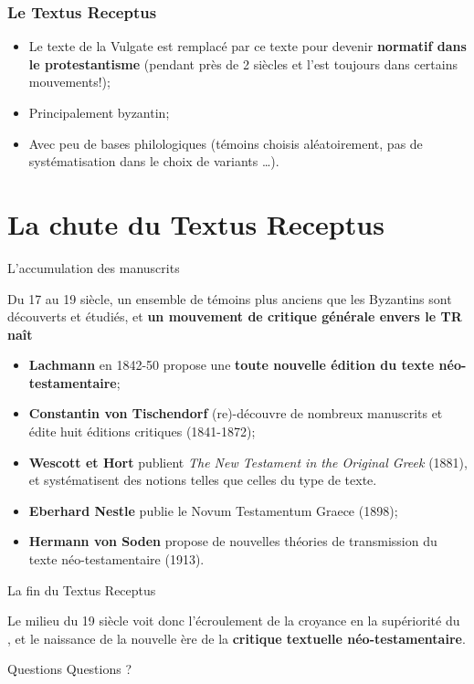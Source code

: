 \documentclass[11pt]{beamer}
\begin{document}
\begin{frame}
  \frametitle{Le Textus Receptus}
    \begin{itemize}
        \item Le texte de la Vulgate est remplacé par ce texte pour devenir \textbf{normatif dans le protestantisme} (pendant près de 2 siècles et l'est toujours dans certains mouvements!);
        \item Principalement byzantin;
        \item Avec peu de bases philologiques (témoins choisis aléatoirement, pas de systématisation dans le choix de variants \dots).
    \end{itemize}
\end{frame}

\section{La chute du Textus Receptus}

\begin{frame}{L'accumulation des manuscrits}
\begin{alertblock}{}
    Du 17\ieme{} au 19\ieme{} siècle, un ensemble de témoins plus anciens que les Byzantins sont découverts et étudiés, et \textbf{un mouvement de critique générale envers le TR naît}
\end{alertblock}
\begin{itemize}
    \item \textbf{Lachmann} en 1842-50 propose une \textbf{toute nouvelle édition du texte néo-testamentaire};
    \item \textbf{Constantin von Tischendorf} (re)-découvre de nombreux manuscrits et édite huit éditions critiques (1841-1872);
    \item \textbf{Wescott et Hort} publient \textit{The New Testament in the Original Greek} (1881), et systématisent des notions telles que celles du type de texte.
    \item \textbf{Eberhard Nestle} publie le Novum Testamentum Graece (1898);
    \item \textbf{Hermann von Soden} propose de nouvelles théories de transmission du texte néo-testamentaire (1913).
\end{itemize}
\end{frame}

\begin{frame}{La fin du Textus Receptus}
\begin{alertblock}{}
       Le milieu du 19\ieme{} siècle voit donc l'écroulement de la croyance en la supériorité du , et le naissance de la nouvelle ère de la \textbf{critique textuelle néo-testamentaire}. 
\end{alertblock}
\end{frame}

\begin{frame}{Questions}
    Questions ?
\end{frame}
\end{document}
